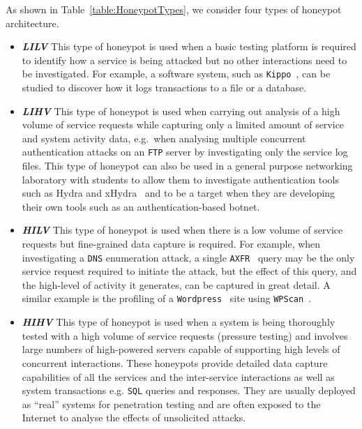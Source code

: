 \documentclass{ieeeaccess}
\begin{document}
As shown in Table~\ref{table:HoneypotTypes}, we consider four types 
of honeypot architecture.

\begin{itemize}

  \item \noindent \textit{\textbf{LILV}} This type of honeypot is used when a
    basic testing platform is required to identify how a service is being
    attacked but no other interactions need to be investigated. For example, a
    software system, such as \texttt{Kippo}~\cite{SH:15}, can be studied to
    discover how it logs transactions to a file or a database. 

  \item \noindent \textit{\textbf{LIHV}} This type of honeypot is used when
    carrying out analysis of a high volume of service requests while capturing
    only a limited amount of service and system activity data, e.g.\ when
    analysing multiple concurrent authentication attacks on an
    \texttt{FTP} server by investigating only the service log files. This type of
    honeypot can also be used in a general purpose networking laboratory with
    students to allow them to investigate authentication tools such as Hydra
    and xHydra~\cite{RS:15} and to be a target when they are developing their
    own tools such as an authentication-based botnet.

  \item \noindent \textit{\textbf{HILV}} This type of honeypot is used when there
    is a low volume of service requests but fine-grained data capture is
    required. For example, when investigating a \texttt{DNS} enumeration
    attack, a single \texttt{AXFR}~\cite{EL:10} query may be the only service
    request required to initiate the attack, but the effect of this query, and
    the high-level of activity it generates, can be captured in great detail.  A
    similar example is the profiling of a \texttt{Wordpress}~\cite{WP:17} site
    using \texttt{WPScan}~\cite{WT:17}.

  \item \noindent \textit{\textbf{HIHV}} This type of honeypot is used when a
    system is being thoroughly tested with a high volume of service requests
    (pressure testing) and involves large numbers of high-powered servers capable
    of supporting high levels of concurrent interactions. These honeypots
    provide detailed data capture capabilities of all the services and the
    inter-service interactions as well as system transactions e.g. \texttt{SQL}
    queries and responses. They are usually deployed as ``real'' systems for
    penetration testing and are often exposed to the Internet to analyse the
    effects of unsolicited attacks.  

\end{itemize}
\end{document}
